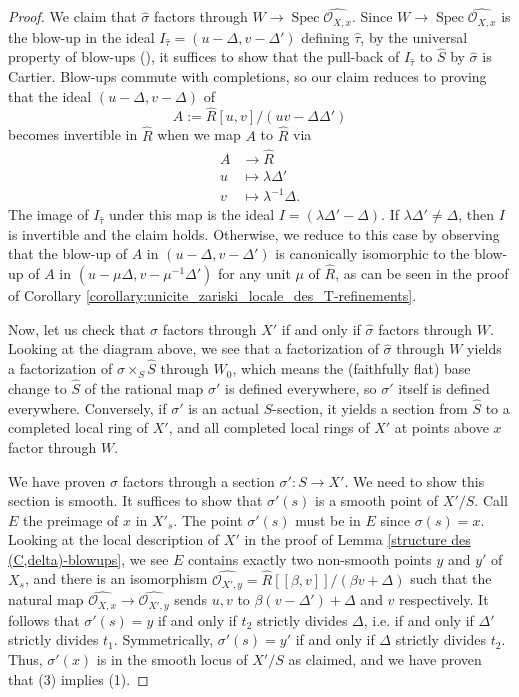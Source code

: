 \documentclass[a4paper,12pt]{amsart} %
\numberwithin{equation}{subsection}
\newcommand{\Spec}{\operatorname{Spec}}
\theoremstyle{definition}
\theoremstyle{plain}%
\theoremstyle{remark}
\renewcommand{\O}{\mathcal{O}}
\begin{document}
\begin{proof}
		We claim that $\widehat{\sigma}$ factors through $W\to\Spec\widehat{\O_{X,x}}$. Since $W\to\Spec\widehat{\O_{X,x}}$ is the blow-up in the ideal $I_{\widehat{\tau}}=(u-\Delta,v-\Delta')$ defining $\widehat{\tau}$, by the universal property of blow-ups (\cite[\href{https://stacks.math.columbia.edu/tag/085U}{Tag 085U}]{stacks-project}), it suffices to show that the pull-back of $I_{\widehat{\tau}}$ to $\widehat{S}$ by $\widehat{\sigma}$ is Cartier. Blow-ups commute with completions, so our claim reduces to proving that the ideal $(u-\Delta,v-\Delta)$ of
		\[
		A:=\widehat{R}[u,v]/(uv-\Delta\Delta')
		\]
		becomes invertible in $\widehat{R}$ when we map $A$ to $\widehat{R}$ via
		\begin{align*}
		A & \to \widehat{R} \\
		u & \mapsto \lambda\Delta' \\
		v & \mapsto \lambda^{-1}\Delta.
		\end{align*}
		The image of $I_{\widehat{\tau}}$ under this map is the ideal $I=(\lambda\Delta'-\Delta)$. If $\lambda\Delta'\neq\Delta$, then $I$ is invertible and the claim holds. Otherwise, we reduce to this case by observing that the blow-up of $A$ in $(u-\Delta,v-\Delta')$ is canonically isomorphic to the blow-up of $A$ in $(u-\mu\Delta,v-\mu^{-1}\Delta')$ for any unit $\mu$ of $\widehat{R}$, as can be seen in the proof of Corollary \ref{corollary:unicite_zariski_locale_des_T-refinements}.
		
		Now, let us check that $\sigma$ factors through $X'$ if and only if $\widehat{\sigma}$ factors through $W$. Looking at the diagram above, we see that a factorization of $\widehat{\sigma}$ through $W$ yields a factorization of $\sigma\times_S\widehat{S}$ through $W_0$, which means the (faithfully flat) base change to $\widehat{S}$ of the rational map $\sigma'$ is defined everywhere, so $\sigma'$ itself is defined everywhere. Conversely, if $\sigma'$ is an actual $S$-section, it yields a section from $\widehat{S}$ to a completed local ring of $X'$, and all completed local rings of $X'$ at points above $x$ factor through $W$.
		
		We have proven $\sigma$ factors through a section $\sigma'\colon S\to X'$. We need to show this section is smooth. It suffices to show that $\sigma'(s)$ is a smooth point of $X'/S$. Call $E$ the preimage of $x$ in $X'_s$. The point $\sigma'(s)$ must be in $E$ since $\sigma(s)=x$. Looking at the local description of $X'$ in the proof of Lemma \ref{structure des (C,delta)-blowups}, we see $E$ contains exactly two non-smooth points $y$ and $y'$ of $X_s$, and there is an isomorphism $\widehat{\O_{X',y}}=\widehat{R}[[\beta,v]]/(\beta v+\Delta)$ such that the natural map $\widehat{\O_{X,x}}\to\widehat{\O_{X',y}}$ sends $u,v$ to $\beta(v-\Delta')+\Delta$ and $v$ respectively. It follows that $\sigma'(s)=y$ if and only if $t_2$ strictly divides $\Delta$, i.e. if and only if $\Delta'$ strictly divides $t_1$. Symmetrically, $\sigma'(s)=y'$ if and only if $\Delta$ strictly divides $t_2$. Thus, $\sigma'(x)$ is in the smooth locus of $X'/S$ as claimed, and we have proven that (3) implies (1).
		

\end{proof}
\end{document}
